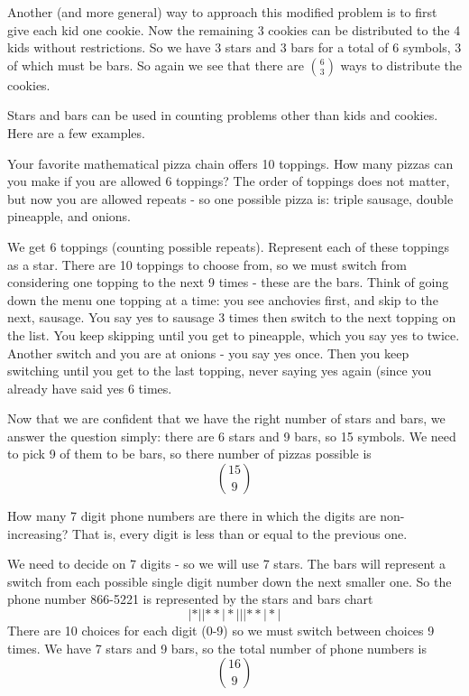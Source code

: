\documentclass[12pt]{article}
\begin{document}
Another (and more general) way to approach this modified problem is to first give each kid one cookie.  Now the remaining 3 cookies can be distributed to the 4 kids without restrictions.  So we have 3 stars and 3 bars for a total of 6 symbols, 3 of which must be bars.  So again we see that there are ${6 \choose 3}$ ways to distribute the cookies.



Stars and bars can be used in counting problems other than kids and cookies.  Here are a few examples.

\begin{example}
  Your favorite mathematical pizza chain offers 10 toppings.  How many pizzas can you make if you are allowed 6 toppings?  The order of toppings does not matter, but now you are allowed repeats - so one possible pizza is: triple sausage, double pineapple, and onions.
  \begin{solution}
    We get 6 toppings (counting possible repeats).  Represent each of these toppings as a star.  There are 10 toppings to choose from, so we must switch from considering one topping to the next 9 times - these are the bars.  Think of going down the menu one topping at a time: you see anchovies first, and skip to the next, sausage.  You say yes to sausage 3 times then switch to the next topping on the list.  You keep skipping until you get to pineapple, which you say yes to twice.  Another switch and you are at onions - you say yes once.  Then you keep switching until you get to the last topping, never saying yes again (since you already have said yes 6 times.
    
    Now that we are confident that we have the right number of stars and bars, we answer the question simply: there are 6 stars and 9 bars, so 15 symbols.  We need to pick 9 of them to be bars, so there number of pizzas possible is
    \[{15 \choose 9}\]
  \end{solution}
\end{example}


\begin{example}
  How many 7 digit phone numbers are there in which the digits are non-increasing?  That is, every digit is less than or equal to the previous one.


\begin{solution}
  We need to decide on 7 digits - so we will use 7 stars.  The bars will represent a switch from each possible single digit number down the next smaller one.  So the phone number 866-5221 is represented by the stars and bars chart
  \[|*||**|*|||**|*|\]
  There are 10 choices for each digit (0-9) so we must switch between choices 9 times.  We have 7 stars and 9 bars, so the total number of phone numbers is
  \[{16 \choose 9}\]
\end{solution}
\end{example}
\end{document}

